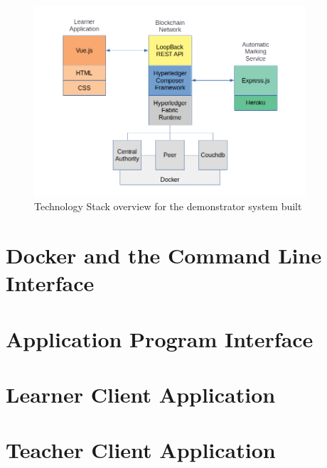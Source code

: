 \begin{figure}[!ht] 
    \centering    
    \includegraphics[width=0.9\textwidth]{techstack}
    \caption[Technology Stack overview for the demonstrator system built]
        {Technology Stack overview for the demonstrator system built}
    \label{fig:techstack}
\end{figure} 

\section{Docker and the Command Line Interface}

\section{Application Program Interface}

\section{Learner Client Application}

\section{Teacher Client Application}

